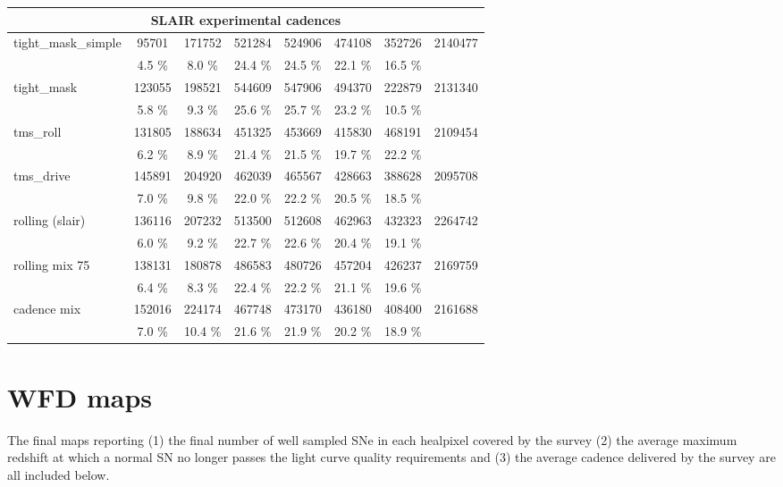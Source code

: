 \begin{appendices}
\begin{longtable}{l|ccccccc}
\hline
\hline
\multicolumn{8}{c}{SLAIR experimental cadences}\\
\hline
   tight\_mask\_simple &   95701 &  171752 &  521284 &  524906 &  474108 &  352726 &  2140477 \\ 
                     &    4.5 \% &    8.0 \% &   24.4 \% &   24.5 \% &   22.1 \% &   16.5 \% & \\
\hline
          tight\_mask &  123055 &  198521 &  544609 &  547906 &  494370 &  222879 &  2131340 \\ 
                     &    5.8 \% &    9.3 \% &   25.6 \% &   25.7 \% &   23.2 \% &   10.5 \% & \\
\hline
            tms\_roll &  131805 &  188634 &  451325 &  453669 &  415830 &  468191 &  2109454 \\ 
                     &    6.2 \% &    8.9 \% &   21.4 \% &   21.5 \% &   19.7 \% &   22.2 \% & \\
\hline
           tms\_drive &  145891 &  204920 &  462039 &  465567 &  428663 &  388628 &  2095708 \\ 
                     &    7.0 \% &    9.8 \% &   22.0 \% &   22.2 \% &   20.5 \% &   18.5 \% & \\
\hline
     rolling (slair) &  136116 &  207232 &  513500 &  512608 &  462963 &  432323 &  2264742 \\ 
                     &    6.0 \% &    9.2 \% &   22.7 \% &   22.6 \% &   20.4 \% &   19.1 \% & \\
\hline
      rolling mix 75 &  138131 &  180878 &  486583 &  480726 &  457204 &  426237 &  2169759 \\ 
                     &    6.4 \% &    8.3 \% &   22.4 \% &   22.2 \% &   21.1 \% &   19.6 \% & \\
\hline
         cadence mix &  152016 &  224174 &  467748 &  473170 &  436180 &  408400 &  2161688 \\ 
                     &    7.0 \% &   10.4 \% &   21.6 \% &   21.9 \% &   20.2 \% &   18.9 \% & \\
         \hline
\end{longtable}

\section{WFD maps}
\label{sec:wfd_maps}
  
  The final maps reporting (1) the final number of well sampled SNe in
  each healpixel covered by the survey (2) the average maximum
  redshift at which a normal SN no longer passes the light curve
  quality requirements and (3) the average cadence delivered by the
  survey are all included below.


\end{appendices}
